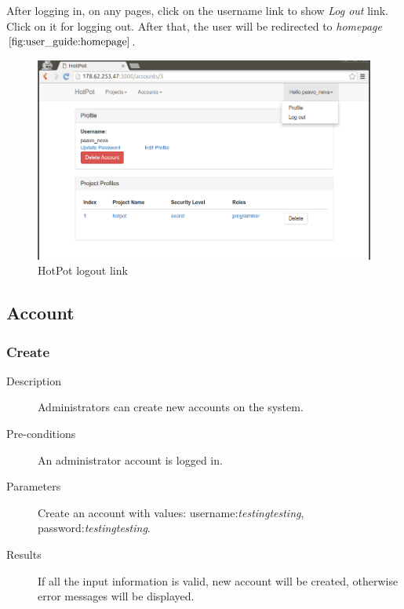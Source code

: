 After logging in, on any pages, click on the username link to show \emph{Log out} link.
Click on it for logging out.
After that, the user will be redirected to \emph{homepage} \(\autoref{fig:user_guide:homepage}\).

\begin{figure}[bth]                                                                                                                                                  \myfloatalign
\includegraphics[width=1.0\linewidth]{gfx/chapter_5/miscellaneous/logout}
\caption[HotPot logout link]{HotPot logout link}
\label{fig:user_guide:miscellaneous:logout}
\end{figure}


\subsection{Account}
\label{ch:result:user_guide:account}
\subsubsection{Create}
\label{ch:result:user_guide:account:create}

\begin{description}
\item[Description] Administrators can create new accounts on the system.
\item[Pre-conditions] An administrator account is logged in.
\item[Parameters] Create an account with values: username:\emph{testingtesting}, password:\emph{testingtesting}.
\item[Results] If all the input information is valid, new account will be created, otherwise error messages will be displayed.
\end{description}

